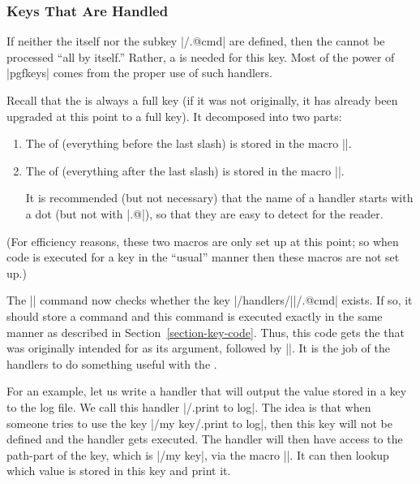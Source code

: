 \subsubsection{Keys That Are Handled}
\label{section-key-handlers}

If neither the  itself nor the subkey |/.@cmd| are
defined, then the  cannot be processed ``all by itself.''
Rather, a  is needed for this key. Most of the power of
|pgfkeys| comes from the proper use of such handlers.

Recall that the  is always a full key (if it was not
originally, it has already been upgraded at this point to a full
key). It decomposed into  two parts:

\begin{enumerate}
\item The  of  (everything
  before the last slash) is stored in the macro |\pgfkeyscurrentpath|.
\item The  of  (everything
  after the last slash) is stored in the macro |\pgfkeyscurrentname|.

  It is recommended (but not necessary) that the name of a handler
  starts with a dot (but not with |.@|), so that they are easy to
  detect for the reader.
\end{enumerate}

(For efficiency reasons, these two macros are only set up at this point;
so when code is executed for a key in the ``usual'' manner then these
macros are not set up.)

The |\pgfkeys| command now checks whether the key
|/handlers/||/.@cmd| exists. If so, it should store a command
and this command is executed exactly in the same manner as described
in Section~\ref{section-key-code}.
Thus, this code gets the  that was originally intended for
 as its argument, followed by |\pgfeov|.
It is the job of the handlers to do something useful with the
.

For an example, let us write a handler that will output the value
stored in a key to the log file. We call this handler
|/.print to log|. The idea is that when someone tries to use the key
|/my key/.print to log|, then this key will not be defined and the
handler gets executed. The handler will then have access to the
path-part of the key, which is |/my key|, via the macro
|\pgfkeyscurrentpath|. It can then lookup which value is stored in
this key and print it.

